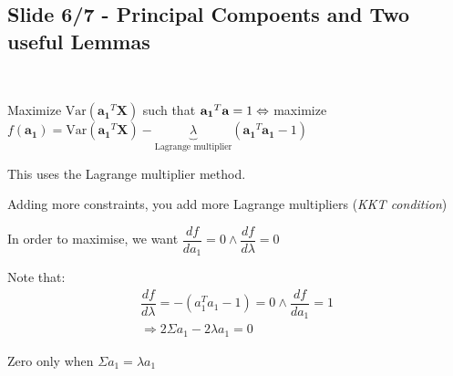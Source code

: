 \subsection{Slide 6/7 - Principal Compoents and Two useful Lemmas}\hfill\\\par
\noindent Maximize $\text{Var}\left(\mathbf{a_1}^T\mathbf{X}\right)$ such that $\mathbf{a_1}^T\mathbf{a} = 1\Leftrightarrow $ maximize $f(\mathbf{a_1}) = \text{Var}\left(\mathbf{a_1}^T\mathbf{X}\right)-\underbrace{\lambda}_{\text{Lagrange multiplier}}(\mathbf{a_1}^T\mathbf{a_1}-1)$\par
\noindent This uses the Lagrange multiplier method.
\par\bigskip
\noindent Adding more constraints, you add more Lagrange multipliers (\textit{KKT condition})
\par\bigskip
\noindent In order to maximise, we want $\dfrac{df}{da_1} = 0\wedge \dfrac{df}{d\lambda} = 0$\par
\noindent Note that:
\begin{equation*}
  \begin{gathered}
    \dfrac{df}{d\lambda} = -(a_1^Ta_1-1) = 0\wedge \dfrac{df}{da_1} = 1\\
    \Rightarrow 2\Sigma a_1-2\lambda a_1=0
  \end{gathered}
\end{equation*}\par
\noindent Zero only when $\Sigma a_1 = \lambda a_1$
\par\bigskip
